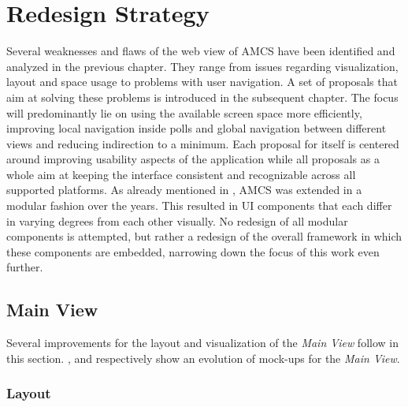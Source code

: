 \chapter{Redesign Strategy}
\label{chapter:redesignstrategy}
Several weaknesses and flaws of the web view of AMCS have been identified and analyzed in the previous chapter. They range from issues regarding visualization, layout and space usage to problems with user navigation.
A set of proposals that aim at solving these problems is introduced in the subsequent chapter. The focus will predominantly lie on using the available screen space more efficiently, improving local navigation inside polls and global navigation between different views and reducing indirection to a minimum. Each proposal for itself is centered around improving usability aspects of the application while all proposals as a whole aim at keeping the interface consistent and recognizable across all supported platforms.
As already mentioned in , AMCS was extended in a modular fashion over the years. This resulted in UI components that each differ in varying degrees from each other visually. 
No redesign of all modular components is attempted, but rather a redesign of the overall framework in which these components are embedded, narrowing down the focus of this work even further.

\section{Main View}

Several improvements for the layout and visualization of the \emph{Main View} follow in this section. ,  and  respectively show an evolution of mock-ups for the \emph{Main View}.
\subsection{Layout}
\label{section:con:proposals:mainview:layout}
